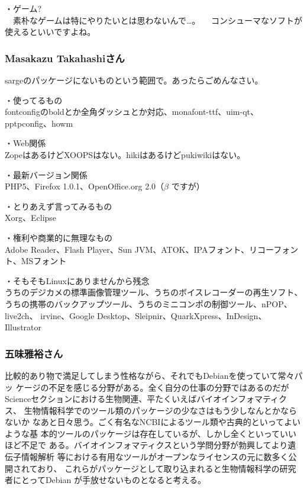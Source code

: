 \documentclass[mingoth]{jsarticle}
\begin{document}
・ゲーム?\\
　素朴なゲームは特にやりたいとは思わないんで…。
　コンシューマなソフトが使えるといいですよね。

\subsubsection{Masakazu Takahashiさん}

sargeのパッケージにないものという範囲で。あったらごめんなさい。

・使ってるもの\\
fontconfigのboldとか全角ダッシュとか対応、monafont-ttf、uim-qt、pptpconfig、howm

・Web関係\\
ZopeはあるけどXOOPSはない。hikiはあるけどpukiwikiはない。

・最新バージョン関係\\
PHP5、Firefox 1.0.1、OpenOffice.org 2.0（$\beta$ ですが）

・とりあえず言ってみるもの\\
Xorg、Eclipse

・権利や商業的に無理なもの\\
Adobe Reader、Flash Player、Sun JVM、ATOK、IPAフォント、リコーフォント、MSフォント

・そもそもLinuxにありませんから残念\\
うちのデジカメの標準画像管理ツール、うちのボイスレコーダーの再生ソフト、
うちの携帯のバックアップツール、うちのミニコンポの制御ツール、nPOP、live2ch、
irvine、Google Desktop、Sleipnir、QuarkXpress、InDesign、Illustrator


\subsubsection{五味雅裕さん}

比較的あり物で満足してしまう性格ながら、それでもDebianを使っていて常々パッ
ケージの不足を感じる分野がある。全く自分の仕事の分野ではあるのだが
Scienceセクションにおける生物関連、平たくいえばバイオインフォマティクス、
生物情報科学でのツール類のパッケージの少なさはもう少しなんとかならないか
なあと日々思う。ごく有名なNCBIによるツール類や古典的といってよいような基
本的ツールのパッケージは存在しているが、しかし全くといっていいほど不足で
ある。バイオインフォマティクスという学問分野が勃興してより遺伝子情報解析
等における有用なツールがオープンなライセンスの元に数多く公開されており、
これらがパッケージとして取り込まれると生物情報科学の研究者にとってDebian
が手放せないものとなると考える。
\end{document}
